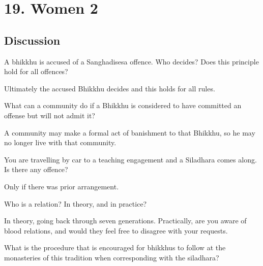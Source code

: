 \chapter{19. Women 2}
\renewcommand*{\theChapterTitle}{19. Women 2}

\section*{Discussion}


A bhikkhu is accused of a Sanghadisesa offence. Who decides? Does this principle hold for all offences?

\begin{solution}
  Ultimately the accused Bhikkhu decides and this holds for all rules. 
\end{solution}

\bigskip

What can a community do if a Bhikkhu is considered to have committed an offense but will not admit it?

\begin{solution}
  A community may make a formal act of banishment to that Bhikkhu, so he may no
  longer live with that community.
\end{solution}

\bigskip


You are travelling by car to a teaching engagement and a Siladhara comes along. Is there any offence?

\begin{solution}
  Only if there was prior arrangement.
\end{solution}

\bigskip

Who is a relation? In theory, and in practice?

\begin{solution}
  In theory, going back through seven generations. Practically, are you aware of
  blood relations, and would they feel free to disagree with your requests.
\end{solution}

\bigskip

What is the procedure that is encouraged for bhikkhus to follow at the monasteries of this tradition 
when corresponding with the siladhara?


